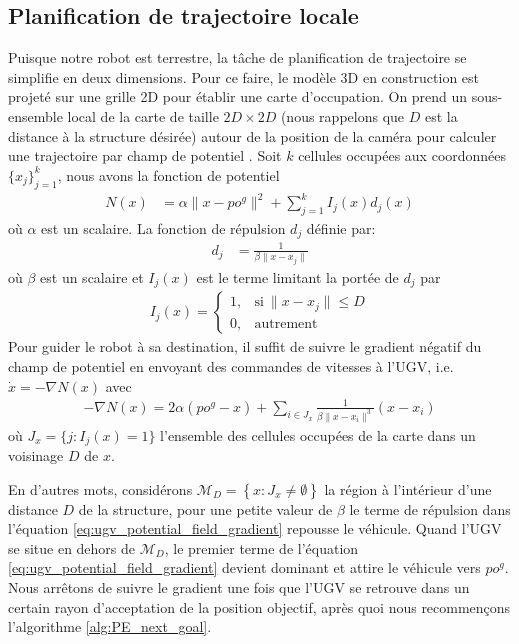\subsection{Planification de trajectoire locale}

Puisque notre robot est terrestre, la tâche de planification de trajectoire se simplifie en deux dimensions. Pour ce faire, le modèle 3D en construction est projeté sur une grille 2D pour établir une carte d'occupation. On prend un sous-ensemble local de la carte de taille $2D \times 2D$ (nous rappelons que $D$ est la distance à la structure désirée) autour de la position de la caméra pour calculer une trajectoire par champ de potentiel \citep{Khatib1990, Choset2005}. Soit $k$ cellules occupées aux coordonnées $\{x_j\}^k_{j=1}$, nous avons la fonction de potentiel
\begin{align}
  N(x) &= \alpha \| x - {po}^g \|^2 + \sum^k_{j=1} I_j(x)d_j(x)
\end{align}
où $\alpha$ est un scalaire. La fonction de répulsion $d_j$ définie par:
\begin{align}
  d_j &= \frac{1}{\beta \| x - x_j \|}
\end{align}
où $\beta$ est un scalaire et $I_j(x)$ est le terme limitant la portée de $d_j$ par
\begin{align}
  I_j(x) =     \begin{cases}
      1, & \text{si}\ \|x - x_j\| \leq D \\
      0, & \text{autrement}
    \end{cases}
\end{align}
Pour guider le robot à sa destination, il suffit de suivre le gradient négatif du champ de potentiel en envoyant des commandes de vitesses à l'UGV, i.e. $\dot x = -\nabla N(x)$ avec
\begin{align}
  - \nabla N(x) = 2 \alpha ({po}^g - x) + \sum_{i \in J_x}\frac{1}{\beta \| x - x_i\|^3}(x - x_i)
  \label{eq:ugv_potential_field_gradient}
\end{align}
où $J_x = \{ j : I_j(x) = 1\}$ l'ensemble des cellules occupées de la carte dans un voisinage $D$ de $x$.

En d'autres mots, considérons $\mathcal M_D = \left\lbrace x : J_{x} \neq \emptyset \right\rbrace $ la région à l'intérieur d'une distance $D$ de la structure, pour une petite valeur de $\beta$ le terme de répulsion dans l'équation \ref{eq:ugv_potential_field_gradient} repousse le véhicule. Quand l'UGV se situe en dehors de $\mathcal M_D$, le premier terme de l'équation \ref{eq:ugv_potential_field_gradient} devient dominant et attire le véhicule vers $po^g$. Nous arrêtons de suivre le gradient une fois que l'UGV se retrouve dans un certain rayon d'acceptation de la position objectif, après quoi nous recommençons l'algorithme \ref{alg:PE_next_goal}.

